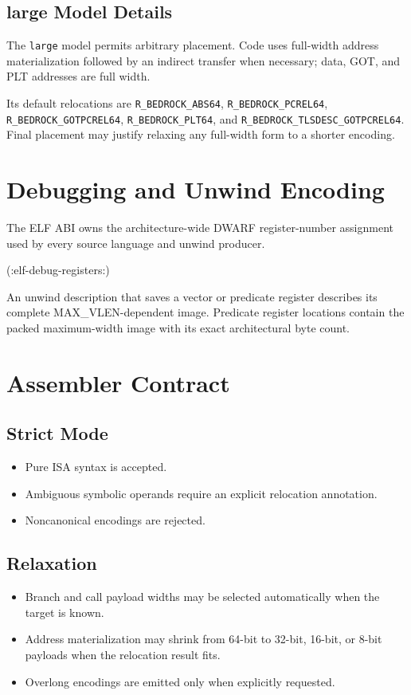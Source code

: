 \documentclass[10pt,twoside]{article}
\begin{document}
\subsection{large Model Details}
The \texttt{large} model permits arbitrary placement. Code uses full-width
address materialization followed by an indirect transfer when necessary; data,
GOT, and PLT addresses are full width.

Its default relocations are \texttt{R\_BEDROCK\_ABS64},
\texttt{R\_BEDROCK\_PCREL64}, \texttt{R\_BEDROCK\_GOTPCREL64},
\texttt{R\_BEDROCK\_PLT64}, and
\texttt{R\_BEDROCK\_TLSDESC\_GOTPCREL64}. Final placement may justify
relaxing any full-width form to a shorter encoding.

\clearpage
\section{Debugging and Unwind Encoding}\label{page:debugging-and-unwind}
The ELF ABI owns the architecture-wide DWARF register-number assignment used
by every source language and unwind producer.

(:elf-debug-registers:)

An unwind description that saves a vector or predicate register describes its
complete MAX\_VLEN-dependent image. Predicate register locations contain the
packed maximum-width image with its exact architectural byte count.

\clearpage
\section{Assembler Contract}\label{page:assembler-contract}
\subsection{Strict Mode}
\begin{itemize}
\item Pure ISA syntax is accepted.
\item Ambiguous symbolic operands require an explicit relocation annotation.
\item Noncanonical encodings are rejected.
\end{itemize}
\subsection{Relaxation}
\begin{itemize}
\item Branch and call payload widths may be selected automatically when the target is known.
\item Address materialization may shrink from 64-bit to 32-bit, 16-bit, or 8-bit payloads when the relocation result fits.
\item Overlong encodings are emitted only when explicitly requested.
\end{itemize}
\end{document}
